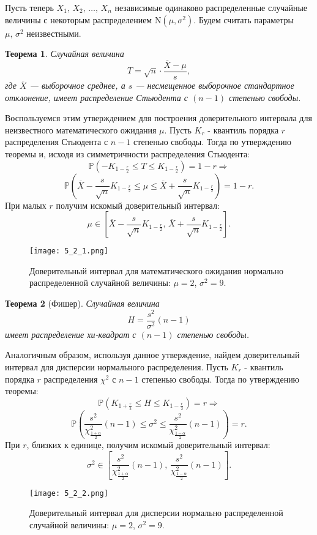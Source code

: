 \documentclass[a4paper, 11pt]{article}
\theoremstyle{def}
\theoremstyle{th}
\newtheorem{theorem}{Теорема}[section]
\theoremstyle{rem}
\newcommand{\p}{\mathbb{P}}
\begin{document}
Пусть теперь $X_1,\,X_2,\,\ldots,\,X_n$ независимые одинаково распределенные случайные величины с некоторым распределением $\mbox{N}(\mu, \sigma^2)$. Будем считать параметры $\mu,\, \sigma^2$ неизвестными.

\begin{theorem}
        Случайная величина
$$
        T = \sqrt{n} \cdot \frac{\overline X - \mu}{s},
$$
        где $\overline X$ --- выборочное среднее, а $s$ --- несмещенное выборочное стандартное отклонение, имеет распределение Стьюдента с $(n-1)$ степенью свободы.
\end{theorem}

Воспользуемся этим утверждением для построения доверительного интервала для неизвестного математического ожидания $\mu$. Пусть $K_r$ - квантиль порядка $r$ распределения Стьюдента с $n-1$ степенью свободы. Тогда по утверждению теоремы и, исходя из симметричности распределения Стьюдента:
$$
\p(-K_{1-\frac{r}{2}} \leqslant T \leqslant K_{1-\frac{r}{2}}) = 1-r \Rightarrow 
$$
$$
\p(\overline X - \frac{s}{\sqrt{n}} K_{1 - \frac{r}{2}} \leqslant \mu \leqslant \overline X + \frac{s}{\sqrt{n}} K_{1 - \frac{r}{2}})
        =
        1 - r.
$$
При малых $r$ получим искомый доверительный интервал:
$$
\mu \in \left[\overline X - \frac{s}{\sqrt{n}} K_{1 - \frac{r}{2}}, \, \overline X + \frac{s}{\sqrt{n}} K_{1 - \frac{r}{2}}\right].
$$
\begin{figure}[H]
        \noindent
        \centering
        {
                \texttt{[image: 5\_2\_1.png]}
        }
        \caption{Доверительный интервал для математического ожидания нормально распределенной случайной величины: $\mu = 2$, $\sigma^2 = 9$.}
\end{figure}

\begin{theorem}[Фишер]
        Случайная величина
$$
        H = \frac{s^2}{\sigma^2}(n - 1)
$$
        имеет распределение хи-квадрат с $(n-1)$ степенью свободы.
\end{theorem}
Аналогичным образом, используя данное утверждение, найдем доверительный интервал для дисперсии нормального распределения. Пусть $K_r$ - квантиль порядка $r$ распределения $\chi^2$ с $n-1$ степенью свободы. Тогда по утверждению теоремы:
$$
\p(K_{1+\frac{r}{2}} \leqslant H \leqslant K_{1-\frac{r}{2}}) = r \Rightarrow 
$$
$$
\p\left(\frac{s^2}{\chi^2_{\frac{1 + \alpha}{2}}}
                (n - 1) \leqslant \sigma^2 \leqslant \frac{s^2}{\chi^2_{\frac{1 - \alpha}{2}}}
                (n - 1)\right)
        =
        r.
$$
При $r$, близких к единице, получим искомый доверительный интервал:
$$
\sigma^2 \in \left[\frac{s^2}{\chi^2_{\frac{1 + \alpha}{2}}}
                (n - 1), \, \frac{s^2}{\chi^2_{\frac{1 - \alpha}{2}}}
                (n - 1)\right].
$$
\begin{figure}[H]
        \noindent
        \centering
        {
                \texttt{[image: 5\_2\_2.png]}
        }
        \caption{Доверительный интервал для дисперсии нормально распределенной случайной величины: $\mu = 2$, $\sigma^2 = 9$.}
\end{figure}
\end{document}

